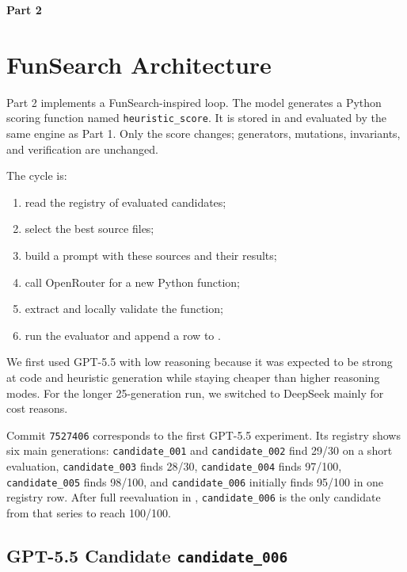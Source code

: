 \documentclass[11pt,a4paper]{article}
\begin{document}
\clearpage
\begin{center}
  {\LARGE\bfseries Part 2}
\end{center}
\vspace{0.6em}

\section{FunSearch Architecture}

Part 2 implements a FunSearch-inspired loop. The model generates a Python scoring function named \texttt{heuristic\_score}. It is stored in  and evaluated by the same engine as Part 1. Only the score changes; generators, mutations, invariants, and verification are unchanged.

The cycle is:
\begin{enumerate}
  \item read the registry of evaluated candidates;
  \item select the best source files;
  \item build a prompt with these sources and their results;
  \item call OpenRouter for a new Python function;
  \item extract and locally validate the function;
  \item run the evaluator and append a row to .
\end{enumerate}

We first used GPT-5.5 with low reasoning because it was expected to be strong at code and heuristic generation while staying cheaper than higher reasoning modes. For the longer 25-generation run, we switched to DeepSeek mainly for cost reasons.

Commit \texttt{7527406} corresponds to the first GPT-5.5 experiment. Its registry shows six main generations: \texttt{candidate\_001} and \texttt{candidate\_002} find 29/30 on a short evaluation, \texttt{candidate\_003} finds 28/30, \texttt{candidate\_004} finds 97/100, \texttt{candidate\_005} finds 98/100, and \texttt{candidate\_006} initially finds 95/100 in one registry row. After full reevaluation in , \texttt{candidate\_006} is the only candidate from that series to reach 100/100.

\subsection{GPT-5.5 Candidate \texttt{candidate\_006}}
\end{document}
